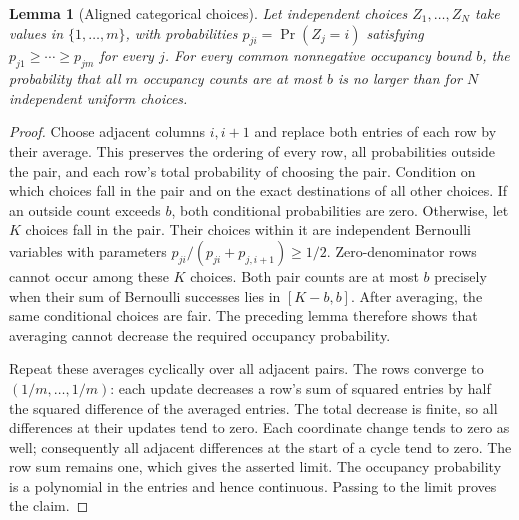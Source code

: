 \documentclass[11pt]{article}
\newtheorem{lemma}{Lemma}
\begin{document}
\begin{lemma}[Aligned categorical choices]\label{lem:aligned}
Let independent choices $Z_1,\ldots,Z_N$ take values in $\{1,\ldots,m\}$,
with probabilities $p_{ji}=\Pr(Z_j=i)$ satisfying
$p_{j1}\geq\cdots\geq p_{jm}$ for every $j$.
For every common nonnegative occupancy bound $b$, the probability that
all $m$ occupancy counts are at most $b$ is no larger than for
$N$ independent uniform choices.
\end{lemma}
\begin{proof}
Choose adjacent columns $i,i+1$ and replace both entries of each row by
their average. This preserves the ordering of every row, all probabilities
outside the pair, and each row's total probability of choosing the pair.
Condition on which choices fall in the pair and on the exact destinations
of all other choices. If an outside count exceeds $b$, both conditional
probabilities are zero. Otherwise, let $K$ choices fall in the pair.
Their choices within it are independent Bernoulli variables with parameters
$p_{ji}/(p_{ji}+p_{j,i+1})\geq1/2$. Zero-denominator rows cannot occur
among these $K$ choices. Both pair counts are at most $b$ precisely when
their sum of Bernoulli successes lies in $[K-b,b]$. After averaging,
the same conditional choices are fair. The preceding lemma therefore
shows that averaging cannot decrease the required occupancy probability.

Repeat these averages cyclically over all adjacent pairs. The rows converge
to $(1/m,\ldots,1/m)$: each update decreases a row's sum of squared entries
by half the squared difference of the averaged entries. The total decrease
is finite, so all differences at their updates tend to zero. Each coordinate
change tends to zero as well; consequently all adjacent differences at
the start of a cycle tend to zero. The row sum remains one, which gives
the asserted limit. The occupancy probability is a polynomial in the
entries and hence continuous. Passing to the limit proves the claim.
\end{proof}
\end{document}
